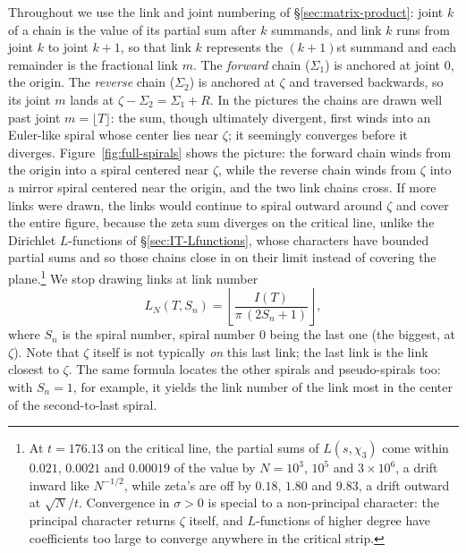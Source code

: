 \documentclass[11pt]{article}
\theoremstyle{definition}
\begin{document}
Throughout we use the link and joint numbering of
\S\ref{sec:matrix-product}: joint $k$ of a chain is the value of its partial
sum after $k$ summands, and link $k$ runs from joint $k$ to joint $k+1$, so
that link $k$ represents the $(k+1)$st summand and each remainder is the
fractional link $m$. The \emph{forward} chain ($\Sigma_1$) is
anchored at joint $0$, the origin. The \emph{reverse} chain ($\Sigma_2$) is
anchored at $\zeta$ and traversed backwards, so its joint $m$ lands at
$\zeta-\Sigma_2=\Sigma_1+R$. In the pictures the chains are drawn well past
joint $m=\lfloor T\rfloor$: the sum, though ultimately divergent, first winds
into an Euler-like spiral whose center lies near $\zeta$; it seemingly
converges before it diverges. Figure~\ref{fig:full-spirals} shows the picture:
the forward chain winds from the origin into a spiral centered near $\zeta$,
while the reverse chain winds from $\zeta$ into a mirror spiral centered near
the origin, and the two link chains cross. If more links were drawn, the links would
continue to spiral outward around $\zeta$ and cover the entire figure, because
the zeta sum diverges on the critical line, unlike the Dirichlet
$L$-functions of \S\ref{sec:IT-Lfunctions}, whose characters have bounded partial sums and
so those chains close in on their limit instead of covering the plane.\footnote{At $t=176.13$ on the critical line, the partial
sums of $L(s,\chi_3)$ come within $0.021$, $0.0021$ and $0.00019$ of the value
by $N=10^{3}$, $10^{5}$ and $3\times10^{6}$, a drift inward like $N^{-1/2}$,
while zeta's are off by $0.18$, $1.80$ and $9.83$, a drift outward at
$\sqrt{N}/t$. Convergence in $\sigma>0$ is special to a non-principal
character: the principal character returns $\zeta$ itself, and $L$-functions
of higher degree have coefficients too large to converge anywhere in the
critical strip.} We stop drawing links at link number
\begin{equation}\label{eq:LN}
L_N(T,S_n)=\left\lfloor\frac{I(T)}{\pi\,(2S_n+1)}\right\rfloor,
\end{equation}
where $S_n$ is the spiral number, spiral number $0$ being the last one (the
biggest, at $\zeta$). Note that $\zeta$ itself is not typically \emph{on} this
last link; the last link is the link closest to $\zeta$. The same formula
locates the other spirals and pseudo-spirals too: with $S_n=1$, for example, it yields the link
number of the link most in the center of the second-to-last spiral.
\end{document}
